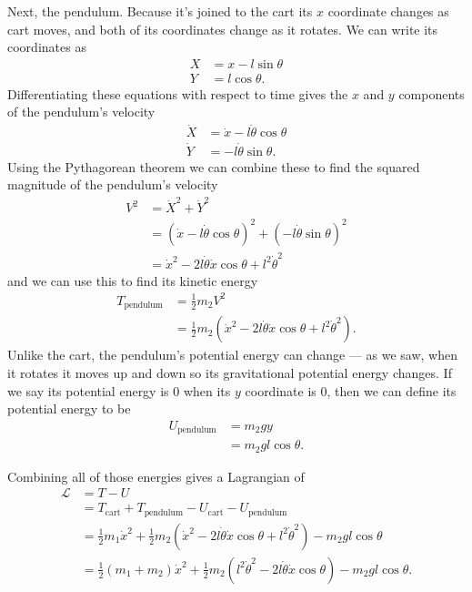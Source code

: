 \documentclass{article}
\begin{document}
Next, the pendulum. Because it's joined to the cart its $x$ coordinate changes as cart moves, and both of its coordinates change as it rotates. We can write its coordinates as \begin{align*}
  X & = x - l \sin \theta \\
  Y & = l \cos \theta.
\end{align*} Differentiating these equations with respect to time gives the $x$ and $y$ components of the pendulum's velocity \begin{align*}
  \dot{X} & = \dot{x} - l \dot{\theta} \cos \theta \\
  \dot{Y} & = -l \dot{\theta} \sin \theta.
\end{align*} Using the Pythagorean theorem we can combine these to find the squared magnitude of the pendulum's velocity \begin{align*}
  V^2 & = \dot{X}^2 + \dot{Y}^2                                                      \\
      & = (\dot{x} - l \dot{\theta} \cos \theta)^2 + (-l \dot{\theta} \sin \theta)^2 \\
      & = \dot{x}^2 - 2 l \dot{\theta} \dot{x} \cos \theta + l^2 \dot{\theta}^2
\end{align*}
and we can use this to find its kinetic energy \begin{align*}
T_\text{pendulum} & = \frac{1}{2} m_2 V^2                                                                          \\
                    & = \frac{1}{2} m_2 (\dot{x}^2 - 2 l \dot{\theta} \dot{x} \cos \theta + l^2 \dot{\theta}^2).
\end{align*} Unlike the cart, the pendulum's potential energy can change — as we saw, when it rotates it moves up and down so its gravitational potential energy changes. If we say its potential energy is $0$ when its $y$ coordinate is $0$, then we can define its potential energy to be \begin{align*}
  U_\text{pendulum} & = m_2 g y              \\
                    & = m_2 g l \cos \theta.
\end{align*}

Combining all of those energies gives a Lagrangian of \begin{align*}
  \mathcal{L} & = T - U                                                                                                                                     \\
              & = T_\text{cart} + T_\text{pendulum} - U_\text{cart} - U_\text{pendulum}                                                                     \\
              & = \frac{1}{2} m_1 \dot{x}^2 + \frac{1}{2} m_2 (\dot{x}^2 - 2 l \dot{\theta} \dot{x} \cos \theta + l^2 \dot{\theta}^2) - m_2 g l \cos \theta \\
              & = \frac{1}{2} (m_1 + m_2) \dot{x}^2 + \frac{1}{2} m_2 (l^2 \dot{\theta}^2 - 2 l \dot{\theta} \dot{x} \cos \theta) - m_2 g l \cos \theta.
\end{align*}
\end{document}
